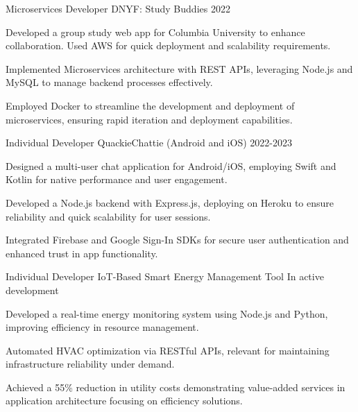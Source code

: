 
\begin{cventries}

  \cventry
    {Microservices Developer} %
    {DNYF: Study Buddies} %
    {} %
    {2022} %
    {
      \begin{cvitems} %
      \item {Developed a group study web app for Columbia University to enhance collaboration. Used AWS for quick deployment and scalability requirements.}
    \item {Implemented Microservices architecture with REST APIs, leveraging Node.js and MySQL to manage backend processes effectively.}
    \item {Employed Docker to streamline the development and deployment of microservices, ensuring rapid iteration and deployment capabilities.}
      \end{cvitems}
    }

  \cventry
    {Individual Developer} %
    {QuackieChattie (Android and iOS)} %
    {} %
    {2022-2023} %
    {
      \begin{cvitems} %
      \item {Designed a multi-user chat application for Android/iOS, employing Swift and Kotlin for native performance and user engagement.}
    \item {Developed a Node.js backend with Express.js, deploying on Heroku to ensure reliability and quick scalability for user sessions.}
    \item {Integrated Firebase and Google Sign-In SDKs for secure user authentication and enhanced trust in app functionality.}
      \end{cvitems}
    }

  \cventry
    {Individual Developer} %
    {IoT-Based Smart Energy Management Tool} %
    {} %
    {In active development} %
    {
      \begin{cvitems} %
      \item {Developed a real-time energy monitoring system using Node.js and Python, improving efficiency in resource management.}
    \item {Automated HVAC optimization via RESTful APIs, relevant for maintaining infrastructure reliability under demand.}
    \item {Achieved a 55\% reduction in utility costs demonstrating value-added services in application architecture focusing on efficiency solutions.}
      \end{cvitems}
    }
\end{cventries}
